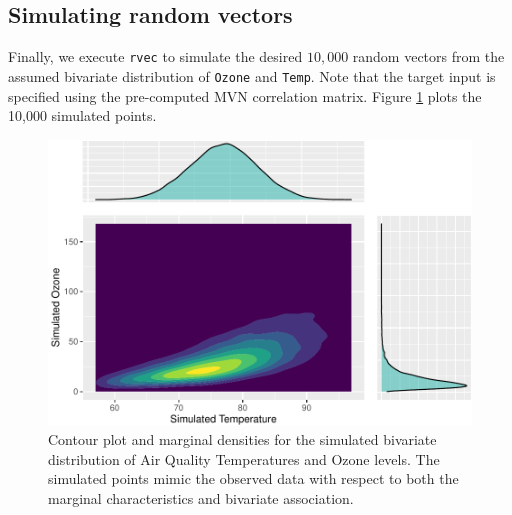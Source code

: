 \documentclass{article}
\newenvironment{Shaded}{\begin{snugshade}}{\end{snugshade}}
\newcommand{\DecValTok}[1]{\textcolor[rgb]{0.00,0.00,0.81}{#1}}
\newcommand{\FunctionTok}[1]{\textcolor[rgb]{0.00,0.00,0.00}{#1}}
\newcommand{\NormalTok}[1]{#1}
\newcommand{\OtherTok}[1]{\textcolor[rgb]{0.56,0.35,0.01}{#1}}
\newcommand{\SpecialCharTok}[1]{\textcolor[rgb]{0.00,0.00,0.00}{#1}}
\begin{document}
\hypertarget{simulating-random-vectors}{%
\subsection{Simulating random vectors}\label{simulating-random-vectors}}

Finally, we execute \texttt{rvec} to simulate the desired \(10,000\)
random vectors from the assumed bivariate distribution of \texttt{Ozone}
and \texttt{Temp}. Note that the target input is specified using the
pre-computed MVN correlation matrix. Figure \ref{fig:ch030-plot-sim}
plots the 10,000 simulated points.

\begin{Shaded}
\end{Shaded}

\begin{figure}
\centering
\includegraphics{ch030-plot-sim-1.pdf}
\caption{\label{fig:ch030-plot-sim}Contour plot and marginal densities
for the simulated bivariate distribution of Air Quality Temperatures and
Ozone levels. The simulated points mimic the observed data with respect
to both the marginal characteristics and bivariate association.}
\end{figure}
\end{document}
